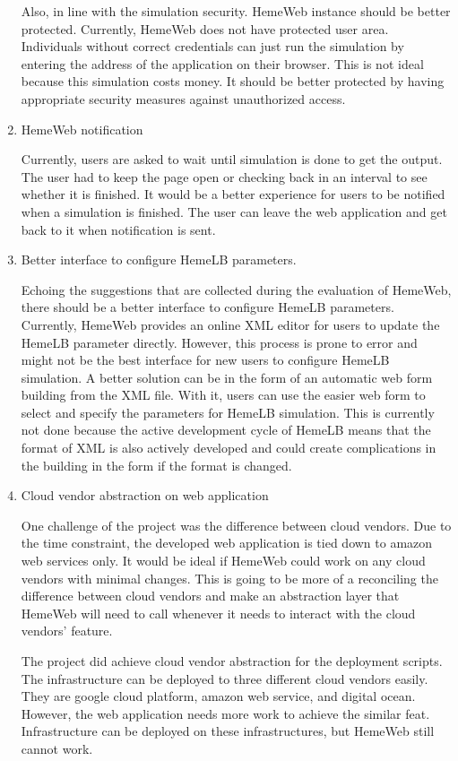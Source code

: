 \begin{enumerate}
  Also, in line with the simulation security. HemeWeb instance should be better protected. Currently, HemeWeb does not have protected user area. Individuals without correct credentials can just run the simulation by entering the address of the application on their browser. This is not ideal because this simulation costs money. It should be better protected by having appropriate security measures against unauthorized access.

   \item HemeWeb notification

   Currently, users are asked to wait until simulation is done to get the output. The user had to keep the page open or checking back in an interval to see whether it is finished. It would be a better experience for users to be notified when a simulation is finished. The user can leave the web application and get back to it when notification is sent.


   \item Better interface to configure HemeLB parameters. 

      Echoing the suggestions that are collected during the evaluation of HemeWeb, there should be a better interface to configure HemeLB parameters. Currently, HemeWeb provides an online XML editor for users to update the HemeLB parameter directly. However, this process is prone to error and might not be the best interface for new users to configure HemeLB simulation. A better solution can be in the form of an automatic web form building from the XML file. With it, users can use the easier web form to select and specify the parameters for HemeLB simulation. This is currently not done because the active development cycle of HemeLB means that the format of XML is also actively developed and could create complications in the building in the form if the format is changed.
    
    \item Cloud vendor abstraction on web application
    
    One challenge of the project was the difference between cloud vendors. Due to the time constraint, the developed web application is tied down to amazon web services only. It would be ideal if HemeWeb could work on any cloud vendors with minimal changes. This is going to be more of a reconciling the difference between cloud vendors and make an abstraction layer that HemeWeb will need to call whenever it needs to interact with the cloud vendors' feature.
    
    The project did achieve cloud vendor abstraction for the deployment scripts. The infrastructure can be deployed to three different cloud vendors easily. They are google cloud platform, amazon web service, and digital ocean. However, the web application needs more work to achieve the similar feat. Infrastructure can be deployed on these infrastructures, but HemeWeb still cannot work.
    
\end{enumerate}

